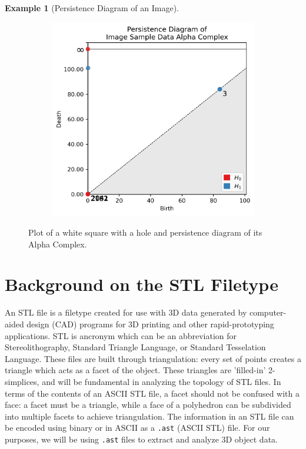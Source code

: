 \documentclass[ma]{uncgdissertationexp}
\theoremstyle{plain}
\theoremstyle{definition}
\newtheorem{example}[theorem]{Example}
\theoremstyle{remark}
\begin{document}
\begin{example}[Persistence Diagram of an Image]
\begin{figure}[H]
\begin{subfigure}[b]{0.45\textwidth}
    \end{subfigure}
    \begin{subfigure}[b]{0.5\textwidth}
        \centering
        \includegraphics[width=\textwidth]{image_data_persdia.png}
    \end{subfigure}
    \caption{Plot of a white square with a hole and persistence diagram of its Alpha Complex.}
    \label{fig:image_data_persdia}
\end{figure}
\end{example}

\newpage
\section{Background on the STL Filetype}
\par An STL file is a filetype created for use with 3D data generated by computer-aided design (CAD) programs for 3D printing and other rapid-prototyping applications. STL is ancronym which can be an abbreviation for Stereolithography, Standard Triangle Language, or Standard Tesselation Language. These files are built through triangulation: every set of points creates a triangle which acts as a facet of the object. These triangles are 'filled-in' 2-simplices, and will be fundamental in analyzing the topology of STL files. In terms of the contents of an ASCII STL file, a facet should not be confused with a face: a facet must be a triangle, while a face of a polyhedron can be subdivided into multiple facets to achieve triangulation. The information in an STL file can be encoded using binary or in ASCII as a \verb".ast" (ASCII STL) file. For our purposes, we will be using \verb".ast" files to extract and analyze 3D object data. \cite{analysis_of_stl}
\end{document}
